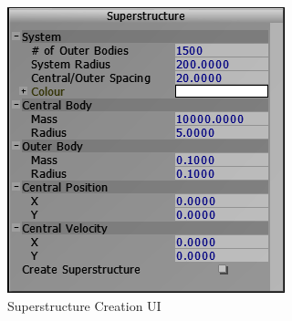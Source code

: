 {\begin{figure}[ht]
  \centering
  \includegraphics[scale=0.7]{../img/superstructureUI.png} 
  \caption{Superstructure Creation UI}
\end{figure}
}

\clearpage